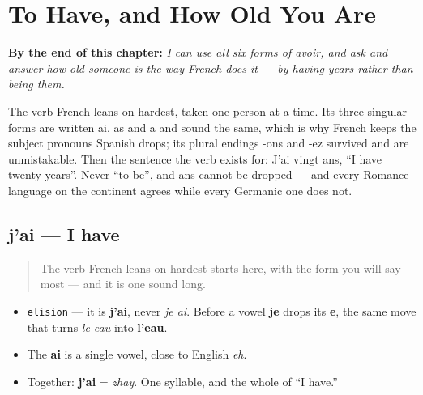 
\chapter{To Have, and How Old You Are}
\label{ch:avoir-age}

\begin{chapteropening}
\textbf{By the end of this chapter:} \emph{I can use all six forms of avoir, and ask and answer how old someone is the way French does it — by having years rather than being them.}

The verb French leans on hardest, taken one person at a time. Its three singular forms are written ai, as and a and sound the same, which is why French keeps the subject pronouns Spanish drops; its plural endings -ons and -ez survived and are unmistakable. Then the sentence the verb exists for: J'ai vingt ans, \textquotedblleft{}I have twenty years\textquotedblright{}. Never \textquotedblleft{}to be\textquotedblright{}, and ans cannot be dropped — and every Romance language on the continent agrees while every Germanic one does not.
\end{chapteropening}

\section[j'ai]{j'ai — I have}

\label{lesson:FR-C14-jai}



\begin{quote}
The verb French leans on hardest starts here, with the form you will say most — and it is one sound long.
\end{quote}

\begin{sounds}
\begin{itemize}
\raggedright
  \item \texttt{elision} — it is \textbf{j'ai}, never \emph{je ai}. Before a vowel \textbf{je} drops its \textbf{e}, the same move that turns \emph{le eau} into \textbf{l'eau}.
  \item The \textbf{ai} is a single vowel, close to English \emph{eh}.
  \item Together: \textbf{j'ai} = \emph{zhay}. One syllable, and the whole of \textquotedblleft{}I have.\textquotedblright{}
\end{itemize}
\end{sounds}

